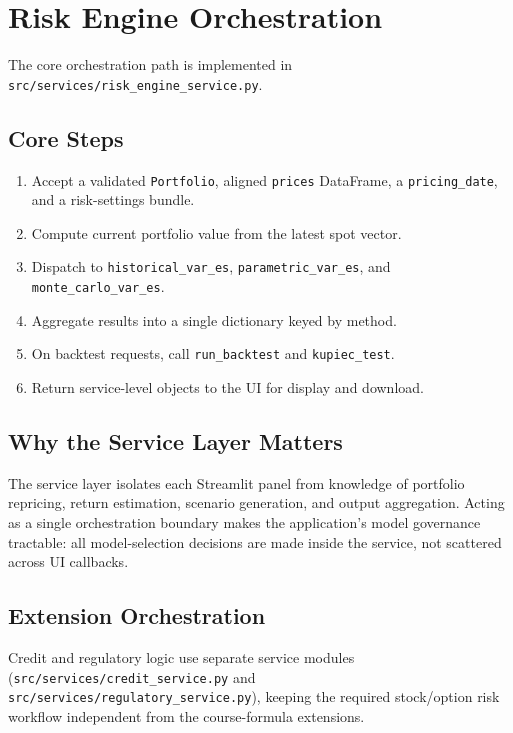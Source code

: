\documentclass[11pt]{article}
\newcommand{\code}[1]{\texttt{#1}}
\begin{document}
\section{Risk Engine Orchestration}

The core orchestration path is implemented in
\code{src/services/risk\_engine\_service.py}.

\subsection{Core Steps}

\begin{enumerate}
  \item Accept a validated \code{Portfolio}, aligned \code{prices} DataFrame,
    a \code{pricing\_date}, and a risk-settings bundle.
  \item Compute current portfolio value from the latest spot vector.
  \item Dispatch to \code{historical\_var\_es}, \code{parametric\_var\_es},
    and \code{monte\_carlo\_var\_es}.
  \item Aggregate results into a single dictionary keyed by method.
  \item On backtest requests, call \code{run\_backtest} and
    \code{kupiec\_test}.
  \item Return service-level objects to the UI for display and download.
\end{enumerate}

\subsection{Why the Service Layer Matters}

The service layer isolates each Streamlit panel from knowledge of
portfolio repricing, return estimation, scenario generation, and output
aggregation.  Acting as a single orchestration boundary makes the
application's model governance tractable: all model-selection decisions
are made inside the service, not scattered across UI callbacks.

\subsection{Extension Orchestration}

Credit and regulatory logic use separate service modules
(\code{src/services/credit\_service.py} and
\code{src/services/regulatory\_service.py}), keeping the required
stock/option risk workflow independent from the course-formula extensions.
\end{document}
